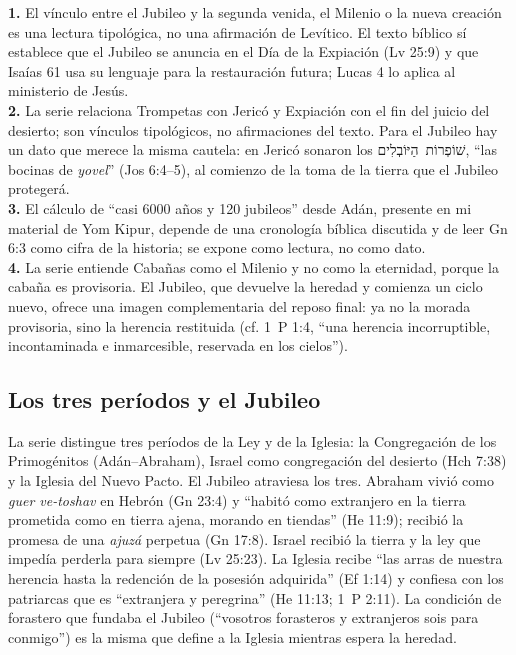 \documentclass[11pt,letterpaper]{article}
\newcommand{\heb}[1]{\mbox{\foreignlanguage{hebrew}{#1}}}
\begin{document}
\begin{nota}[Precisión]
\textbf{1.} El vínculo entre el Jubileo y la segunda venida, el Milenio o la nueva creación es una lectura tipológica, no una afirmación de Levítico. El texto bíblico sí establece que el Jubileo se anuncia en el Día de la Expiación (Lv 25:9) y que Isaías 61 usa su lenguaje para la restauración futura; Lucas 4 lo aplica al ministerio de Jesús.\\
\textbf{2.} La serie relaciona Trompetas con Jericó y Expiación con el fin del juicio del desierto; son vínculos tipológicos, no afirmaciones del texto. Para el Jubileo hay un dato que merece la misma cautela: en Jericó sonaron los \heb{שׁוֹפְרוֹת הַיּוֹבְלִים}, ``las bocinas de \emph{yovel}'' (Jos 6:4--5), al comienzo de la toma de la tierra que el Jubileo protegerá.\\
\textbf{3.} El cálculo de ``casi 6000 años y 120 jubileos'' desde Adán, presente en mi material de Yom Kipur, depende de una cronología bíblica discutida y de leer Gn 6:3 como cifra de la historia; se expone como lectura, no como dato.\\
\textbf{4.} La serie entiende Cabañas como el Milenio y no como la eternidad, porque la cabaña es provisoria. El Jubileo, que devuelve la heredad y comienza un ciclo nuevo, ofrece una imagen complementaria del reposo final: ya no la morada provisoria, sino la herencia restituida (cf. 1~P 1:4, ``una herencia incorruptible, incontaminada e inmarcesible, reservada en los cielos'').
\end{nota}

\subsection{Los tres períodos y el Jubileo}
La serie distingue tres períodos de la Ley y de la Iglesia: la Congregación de los Primogénitos (Adán--Abraham), Israel como congregación del desierto (Hch 7:38) y la Iglesia del Nuevo Pacto. El Jubileo atraviesa los tres. Abraham vivió como \emph{guer ve-toshav} en Hebrón (Gn 23:4) y ``habitó como extranjero en la tierra prometida como en tierra ajena, morando en tiendas'' (He 11:9); recibió la promesa de una \emph{ajuzá} perpetua (Gn 17:8). Israel recibió la tierra y la ley que impedía perderla para siempre (Lv 25:23). La Iglesia recibe ``las arras de nuestra herencia hasta la redención de la posesión adquirida'' (Ef 1:14) y confiesa con los patriarcas que es ``extranjera y peregrina'' (He 11:13; 1~P 2:11). La condición de forastero que fundaba el Jubileo (``vosotros forasteros y extranjeros sois para conmigo'') es la misma que define a la Iglesia mientras espera la heredad.
\end{document}
